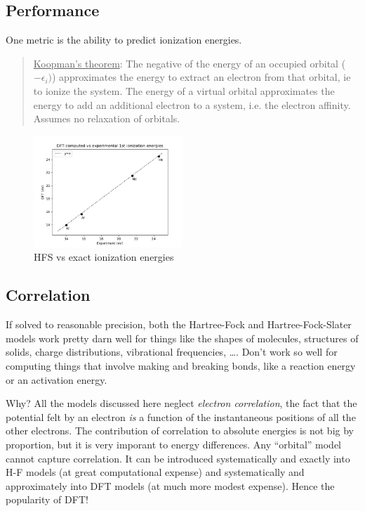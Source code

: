 \documentclass[11pt]{article}
\begin{document}
\subsection{Performance}
\label{sec:org8b69714}
One metric is the ability to predict ionization energies.  
\begin{quote}
\uline{Koopman’s theorem}: The negative of the energy of an occupied orbital (\(-\epsilon_i)\)) approximates the energy to extract an electron from that orbital, ie to ionize the system.   The energy of a virtual orbital approximates the energy to add an additional electron to a system, i.e. the electron affinity.  Assumes no relaxation of orbitals.  
\end{quote}

\begin{figure}[htbp]
\centering
\includegraphics[width=0.5\textwidth]{./Images/Ionization.png}
\caption{HFS vs exact ionization energies}
\end{figure}

\subsection{Correlation}
\label{sec:orgec7c8b8}
If solved to reasonable precision, both the Hartree-Fock and Hartree-Fock-Slater models work pretty darn well for things like the shapes of molecules, structures of solids, charge distributions, vibrational frequencies, \ldots{}.  Don't work so well for computing things that involve making and breaking bonds, like a reaction energy or an activation energy.

Why?  All the models discussed here neglect \emph{electron correlation}, the fact that the
potential felt by an electron \emph{is} a function of the instantaneous positions of all the
other electrons.  The contribution of correlation to absolute energies is not big by
proportion, but it is very imporant to energy differences.  Any ``orbital'' model cannot
capture correlation.  It can be introduced systematically and exactly into H-F models (at
great computational expense) and systematically and approximately into DFT models (at much
more modest expense). Hence the popularity of DFT!
\end{document}
